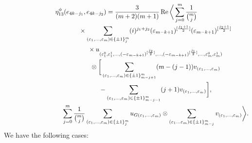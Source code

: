 \documentclass[10pt,a4paper]{amsart}
\numberwithin{equation}{section}
\begin{document}
\begin{gather*}
\eta_{13}^\phi(e_{4k-j_1},e_{4k-j_2})=
 \frac{3}{(m+2)(m+1)}\operatorname{Re}\bigg\langle \sum_{j=0}^{m}\frac{1}{{m\choose j}}\\
 \hphantom{\eta_{13}^\phi(e_{4k-j_1},e_{4k-j_2})=}{}\times
 \sum_{(\varepsilon_{1},\dots, \varepsilon_{m})\in\{\pm
1\}_{j}^{m}}(i)^{j_1+j_2}(\varepsilon_{m-k+1})^{[\frac{j_1+1}{2}]}(\varepsilon_{m-k+1})^{[\frac{j_2+1}{2}]} \\
 \hphantom{\eta_{13}^\phi(e_{4k-j_1},e_{4k-j_2})=}{}\times
 u_{(\varepsilon_{1}^0, \varepsilon_{1}^1, \dots, (-\varepsilon_{m-k+1})^{[\frac{j_2}{2}]} ,\dots, (-\varepsilon_{m-k+1})^{[\frac{j_1}{2}]},\dots, \varepsilon_{m}^0,\varepsilon_{m}^1)}\\
\hphantom{\eta_{13}^\phi(e_{4k-j_1},e_{4k-j_2})=}{} \otimes
 \bigg[ \sum_{(\varepsilon_{1},\dots, \varepsilon_{m})\in\{\pm
1\}_{m-j+1}^{m}}(m-(j-1))v_{(\varepsilon_{1},\dots,\varepsilon_m)}\\
\hphantom{\eta_{13}^\phi(e_{4k-j_1},e_{4k-j_2})=}{}
-\sum_{(\varepsilon_{1},\dots, \varepsilon_{m})\in\{\pm
1\}_{m-j-1}^{m}}(j+1)v_{(\varepsilon_{1},\dots,\varepsilon_m)}\bigg],\\
\hphantom{\eta_{13}^\phi(e_{4k-j_1},e_{4k-j_2})=}{}
 \sum_{j=0}^{m}\frac{1}{{m\choose j}}\sum_{(\varepsilon_{1},\dots, \varepsilon_{m})\in\{\pm
1\}_{j}^{m}}u_{G(\varepsilon_1,\dots,\varepsilon_m)}\otimes
\sum_{(\varepsilon_{1}\dots \varepsilon_{m})\in\{\pm 1\}_{m-j}^{m}}v_{(\varepsilon_1,\dots,\varepsilon_m)}\bigg\rangle.
\end{gather*}
We have the following cases:
\end{document}
